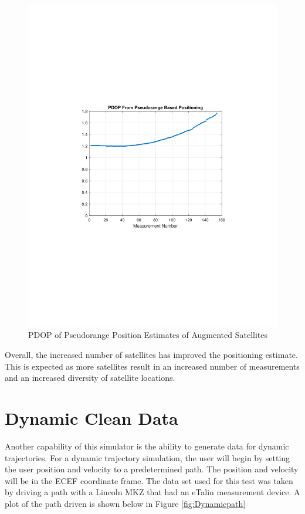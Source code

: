 \documentclass[12pt]{report}
\begin{document}
\begin{figure}[h!]
    \centering
    \includegraphics[trim=1.2in 3.3in 1.75in 3.3in,clip,width=5in]
    {Augment_5min_pseudo_PDOP.pdf}
    \caption{PDOP of Pseudorange Position Estimates of Augmented Satellites}
    \label{fig:AugmentpseudoPDOP}
\end{figure}
Overall, the increased number of satellites has improved the positioning estimate. This is expected as more satellites result in an increased number of measurements and an increased diversity of satellite locations. 

\section{Dynamic Clean Data}
Another capability of this simulator is the ability to generate data for dynamic trajectories. For a dynamic trajectory simulation, the user will begin by setting the user position and velocity to a predetermined path. The position and velocity will be in the ECEF coordinate frame. The data set used for this test was taken by driving a path with a Lincoln MKZ that had an eTalin measurement device. A plot of the path driven is shown below in Figure \ref{fig:Dynamicpath}
\end{document}
